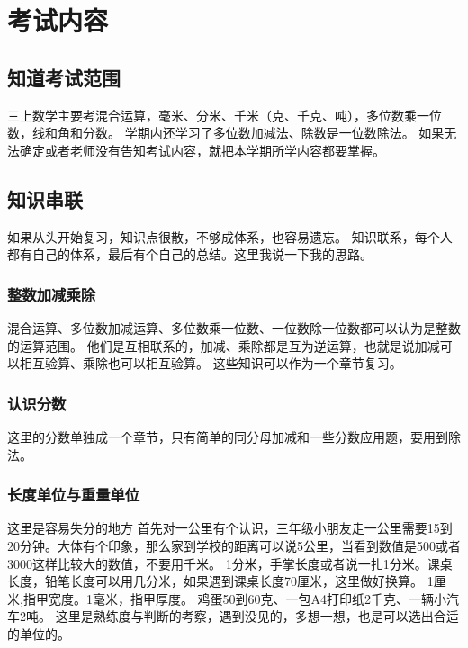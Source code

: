 \documentclass[a4paper,12pt]{article}
\begin{document}
\section{考试内容}

\subsection{知道考试范围}
三上数学主要考混合运算，毫米、分米、千米（克、千克、吨），多位数乘一位数，线和角和分数。\newline
\indent 学期内还学习了多位数加减法、除数是一位数除法。\newline
\indent 如果无法确定或者老师没有告知考试内容，就把本学期所学内容都要掌握。

\subsection{知识串联}
如果从头开始复习，知识点很散，不够成体系，也容易遗忘。\newline
\indent 知识联系，每个人都有自己的体系，最后有个自己的总结。这里我说一下我的思路。

\subsubsection{整数加减乘除}
混合运算、多位数加减运算、多位数乘一位数、一位数除一位数都可以认为是整数的运算范围。
他们是互相联系的，加减、乘除都是互为逆运算，也就是说加减可以相互验算、乘除也可以相互验算。
这些知识可以作为一个章节复习。

\subsubsection{认识分数}
这里的分数单独成一个章节，只有简单的同分母加减和一些分数应用题，要用到除法。

\subsubsection{长度单位与重量单位}
这里是容易失分的地方\newline
首先对一公里有个认识，三年级小朋友走一公里需要15到20分钟。大体有个印象，那么家到学校的距离可以说5公里，当看到数值是500或者3000这样比较大的数值，不要用千米。\newline
1分米，手掌长度或者说一扎1分米。课桌长度，铅笔长度可以用几分米，如果遇到课桌长度70厘米，这里做好换算。\newline
1厘米,指甲宽度。1毫米，指甲厚度。\newline
鸡蛋50到60克、一包A4打印纸2千克、一辆小汽车2吨。\newline
这里是熟练度与判断的考察，遇到没见的，多想一想，也是可以选出合适的单位的。
\end{document}
